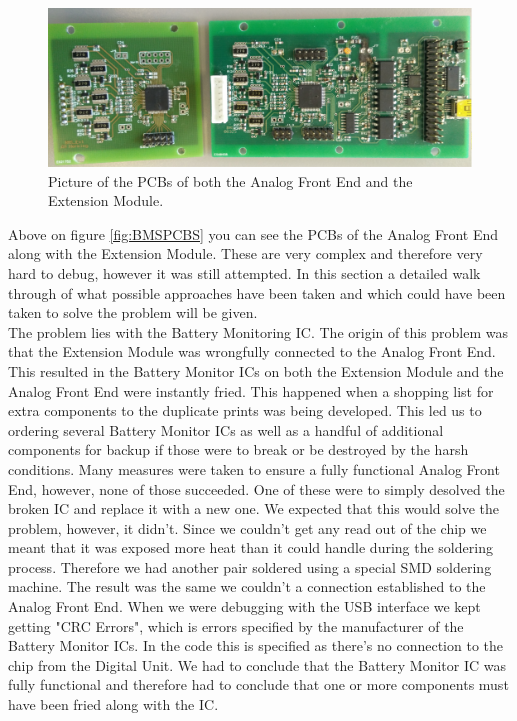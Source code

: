 \begin{figure}[H]
	\centering
	\includegraphics[width=1.0\linewidth]{Hardware/Pictures/BMSPCBS}
	\caption[Empty]{Picture of the PCBs of both the Analog Front End and the Extension Module.}
	\label{fig:BMSPCBS}
\end{figure}

Above on figure \vref{fig:BMSPCBS} you can see the PCBs of the Analog Front End along with the Extension Module. These are very complex and therefore very hard to debug, however it was still attempted. In this section a detailed walk through of what possible approaches have been taken and which could have been taken to solve the problem will be given. \\
The problem lies with the Battery Monitoring IC. The origin of this problem was that the Extension Module was wrongfully connected to the Analog Front End. This resulted in the Battery Monitor ICs on both the Extension Module and the Analog Front End were instantly fried. This happened when a shopping list for extra components to the duplicate prints was being developed. This led us to ordering several Battery Monitor ICs as well as a handful of additional components for backup if those were to break or be destroyed by the harsh conditions. Many measures were taken to ensure a fully functional Analog Front End, however, none of those succeeded. One of these were to simply desolved the broken IC and replace it with a new one. We expected that this would solve the problem, however, it didn't. Since we couldn't get any read out of the chip we meant that it was exposed more heat than it could handle during the soldering process. Therefore we had another pair soldered using a special SMD soldering machine. The result was the same we couldn't a connection established to the Analog Front End. When we were debugging with the USB interface we kept getting "CRC Errors", which is errors specified by the manufacturer of the Battery Monitor ICs. In the code this is specified as there's no connection to the chip from the Digital Unit. We had to conclude that the Battery Monitor IC was fully functional and therefore had to conclude that one or more components must have been fried along with the IC. \\
